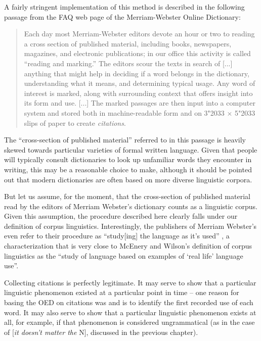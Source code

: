 A fairly stringent implementation of this method is described in the following passage from the FAQ web page of the Merriam\hyp{}Webster Online  Dictionary:

\begin{quotation}
Each day most Merriam\hyp{}Webster editors devote an hour or two to reading a cross section of published material, including books, newspapers,  magazines, and electronic publications; in our office this activity is called ``reading and marking.'' The editors scour the texts in search of [...] anything that might help in deciding if a word belongs in the dictionary,  understanding what it means, and determining typical usage. Any word of interest is marked,  along with surrounding context that offers insight into its form and use. [...] The marked  passages are then input into a computer system and stored both in machine\hyp{}readable form and on 3\char"2033 $\times$ 5\char"2033 slips of paper to create \emph{citations}. \citep{merriam-webster_how_2014}
\end{quotation}

The ``cross\hyp{}section of published material'' referred to in this passage is heavily skewed towards particular varieties  of formal written  language. Given that people will typically consult dictionaries  to look up unfamiliar words they encounter in writing, this may be a reasonable choice to make, although it should be pointed out that modern dictionaries are often based on more diverse linguistic corpora.

But let us assume, for the moment, that the cross\hyp{}section of published material read by the editors of Merriam Webster's dictionary  counts as a linguistic corpus. Given this assumption, the procedure described here clearly falls under our definition of corpus linguistics. Interestingly, the publishers of Merriam Webster's even refer to their procedure as ``study[ing] the language as it's used'' \citep{merriam-webster_how_2014}, a characterization that is very close to McEnery and Wilson's definition of corpus linguistics as the ``study of language based on examples of `real life' language use''.

Collecting citations is perfectly legitimate. It may serve to show that a particular linguistic phenomenon existed at a particular point in time -- one reason for basing the OED  on citations was and is to identify the first recorded use of each word. It may also serve to show that a particular linguistic phenomenon exists at all, for example, if that phenomenon is considered ungrammatical  (as in the case of [\textit{it doesn't matter the} N], discussed in the previous chapter).

